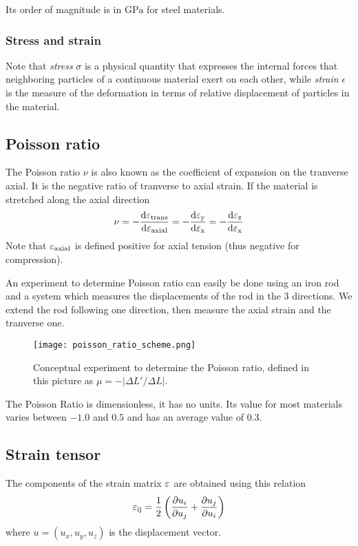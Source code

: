 Its order of magnitude is in $\si{\giga\pascal}$ for steel materials.

\subsubsection*{Stress and strain}
Note that \emph{stress} $\sigma$ is a physical quantity that 
expresses the internal forces that neighboring particles 
of a continuous material exert on each other,
while \emph{strain} $\epsilon$ is the measure of the deformation 
in terms of relative displacement of particles in the material.

\subsection{Poisson ratio}
The Poisson ratio $\nu$ is also known as
the coefficient of expansion on the tranverse axial.
It is the negative ratio of tranverse to axial strain.
If the material is stretched along the axial direction
\[
  \nu = -\frac{\operatorname{d}\!\varepsilon_{\text{trans}}}{\operatorname{d}\!\varepsilon_{\text{axial}}}
  = -\frac{\operatorname{d}\!\varepsilon_{\text{y}}}{\operatorname{d}\!\varepsilon_{\text{x}}}
  = -\frac{\operatorname{d}\!\varepsilon_{\text{z}}}{\operatorname{d}\!\varepsilon_{\text{x}}}
\]
Note that $\varepsilon_{\text{axial}}$ is defined positive for axial tension
(thus negative for compression).

An experiment to determine Poisson ratio can easily be done
using an iron rod and a system which measures the displacements
of the rod in the 3 directions.
We extend the rod following one direction,
then measure the axial strain and the tranverse one.

\begin{figure}
  \begin{center}
    \texttt{[image: poisson\_ratio\_scheme.png]}
    \caption{Conceptual experiment to determine the Poisson ratio,
    defined in this picture as $\mu = - |\Delta L'/\Delta L|$.}
    \label{fig:poisson_ration_scheme}
  \end{center}
\end{figure}

The Poisson Ratio is dimensionless, it has no units.
Its value for most materials varies between $-1.0$ and $0.5$
and has an average value of $0.3$.

\subsection{Strain tensor}
The components of the strain matrix ${\bf \varepsilon_{\text{}}}$
are obtained using this relation
\[ 
  \varepsilon_{\text{ij}} = \frac{1}{2} \left(\frac{\partial u_i}{\partial u_j}
  + \frac{\partial u_j}{\partial u_i}\right)
\]
where $u=(u_x,u_y,u_z)$ is the displacement vector.

